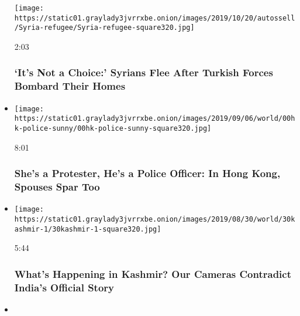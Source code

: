 \begin{itemize}
  \texttt{[image: https://static01.graylady3jvrrxbe.onion/images/2019/10/20/autossell/Syria-refugee/Syria-refugee-square320.jpg]}

  2:03

  \hypertarget{its-not-a-choice-syrians-flee-after-turkish-forces-bombard-their-homes}{%
  \subsubsection{`It's Not a Choice:' Syrians Flee After Turkish Forces
  Bombard Their
  Homes}\label{its-not-a-choice-syrians-flee-after-turkish-forces-bombard-their-homes}}
\item
  \href{https://www.nytimes3xbfgragh.onion/video/world/asia/100000006682566/shes-a-protester-hes-a-police-officer-in-hong-kong-spouses-spar-too.html?action=click\&module=video-series-bar\&region=header\&pgtype=Article\&playlistId=video/on-the-ground}{}

  \texttt{[image: https://static01.graylady3jvrrxbe.onion/images/2019/09/06/world/00hk-police-sunny/00hk-police-sunny-square320.jpg]}

  8:01

  \hypertarget{shes-a-protester-hes-a-police-officer-in-hong-kong-spouses-spar-too}{%
  \subsubsection{She's a Protester, He's a Police Officer: In Hong Kong,
  Spouses Spar
  Too}\label{shes-a-protester-hes-a-police-officer-in-hong-kong-spouses-spar-too}}
\item
  \href{https://www.nytimes3xbfgragh.onion/video/world/asia/100000006676350/kashmir-india-article370.html?action=click\&module=video-series-bar\&region=header\&pgtype=Article\&playlistId=video/on-the-ground}{}

  \texttt{[image: https://static01.graylady3jvrrxbe.onion/images/2019/08/30/world/30kashmir-1/30kashmir-1-square320.jpg]}

  5:44

  \hypertarget{whats-happening-in-kashmir-our-cameras-contradict-indias-official-story}{%
  \subsubsection{What's Happening in Kashmir? Our Cameras Contradict
  India's Official
  Story}\label{whats-happening-in-kashmir-our-cameras-contradict-indias-official-story}}
\item
  \href{https://www.nytimes3xbfgragh.onion/video/world/asia/100000006664889/we-may-die-we-may-be-jailed-on-the-frontlines-with-hong-kongs-protesters.html?action=click\&module=video-series-bar\&region=header\&pgtype=Article\&playlistId=video/on-the-ground}{}


\end{itemize}

